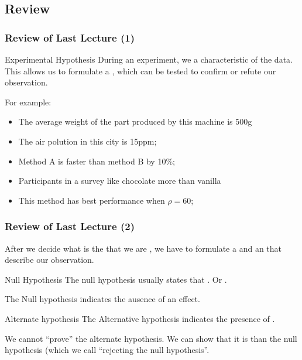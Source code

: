 \documentclass[10pt]{beamer}
\begin{document}
\subsection{Review}
\begin{frame}
  \frametitle{Review of Last Lecture (1)}
  \begin{block}{Experimental Hypothesis}
    During an experiment, we  a characteristic of
    the data. This allows us to formulate a ,
    which can be tested to confirm or refute our observation.
  \end{block}

  For example:

  \begin{itemize}
  \item The average weight of the part produced by this machine is 500g
  \item The air polution in this city is 15ppm;
  \item Method A is faster than method B by 10\%;
  \item Participants in a survey like chocolate more than vanilla
  \item This method has best performance when $\rho = 60$;
  \end{itemize}
\end{frame}

\begin{frame}
  \frametitle{Review of Last Lecture (2)} 

  {\small After we decide what is the  that we are
  , we have to formulate a  and an  that describe
  our observation.}

  \begin{exampleblock}{Null Hypothesis}
    \small
    The null hypothesis usually states that . Or
    . 
    \medskip

    The Null hypothesis indicates the ausence of an effect.
  \end{exampleblock}

  \begin{exampleblock}{Alternate hypothesis}
    \small
    The Alternative hypothesis indicates the presence of .
  \end{exampleblock}

  \bigskip

  {\small We cannot ``prove'' the alternate hypothesis. We can show that it is
   than the null hypothesis (which we call
  ``rejecting the null hypothesis''.}
\end{frame}
\end{document}
